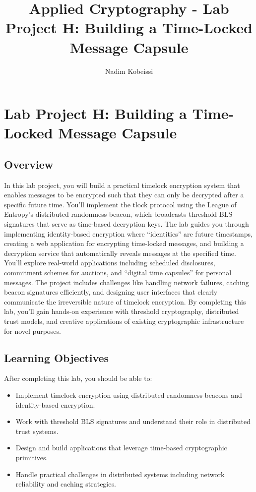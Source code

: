 \documentclass[10pt,a4paper,american]{exam}
\title{Applied Cryptography - Lab Project H: Building a Time-Locked Message Capsule}
\author{Nadim Kobeissi}
\begin{document}
\classhandoutheader
\section*{Lab Project H: Building a Time-Locked Message Capsule}

\subsection*{Overview}
In this lab project, you will build a practical timelock encryption system that enables messages to be encrypted such that they can only be decrypted after a specific future time. You'll implement the tlock protocol using the League of Entropy's distributed randomness beacon, which broadcasts threshold BLS signatures that serve as time-based decryption keys. The lab guides you through implementing identity-based encryption where ``identities'' are future timestamps, creating a web application for encrypting time-locked messages, and building a decryption service that automatically reveals messages at the specified time. You'll explore real-world applications including scheduled disclosures, commitment schemes for auctions, and ``digital time capsules'' for personal messages. The project includes challenges like handling network failures, caching beacon signatures efficiently, and designing user interfaces that clearly communicate the irreversible nature of timelock encryption. By completing this lab, you'll gain hands-on experience with threshold cryptography, distributed trust models, and creative applications of existing cryptographic infrastructure for novel purposes.

\subsection*{Learning Objectives}
After completing this lab, you should be able to:
\begin{itemize}
	\item Implement timelock encryption using distributed randomness beacons and identity-based encryption.
	\item Work with threshold BLS signatures and understand their role in distributed trust systems.
	\item Design and build applications that leverage time-based cryptographic primitives.
	\item Handle practical challenges in distributed systems including network reliability and caching strategies.
\end{itemize}
\end{document}
